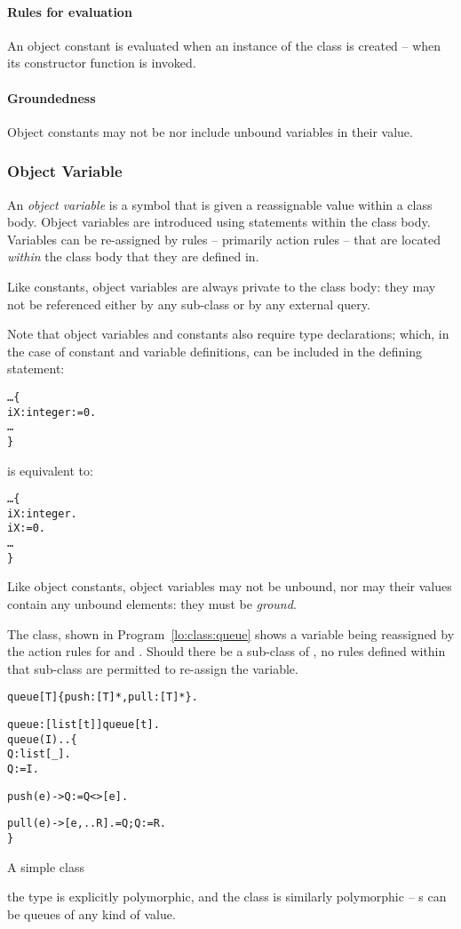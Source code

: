 \paragraph{Rules for evaluation}
An object constant is evaluated when an instance of the class is created -- when its constructor function is invoked.

\paragraph{Groundedness}
Object constants may not be nor include unbound variables in their value. 

\subsubsection{Object Variable}
\label{lo:variable}
An \emph{object variable} is a symbol that is given a reassignable value within a class body. Object variables are introduced using \q{:=} statements within the class body. Variables can be re-assigned by rules -- primarily action rules -- that are located \emph{within} the class body that they are defined in. 

Like constants, object variables are always private to the class body: they may not be referenced either by any sub-class or by any external query.

Note that object variables and constants also require type declarations; which, in the case of constant and variable definitions, can be included in the defining statement:
\begin{alltt}
\ldots\{
  iX:integer := 0.
\ldots
\}
\end{alltt}
is equivalent to:
\begin{alltt}
\ldots\{
  iX:integer.
  iX := 0.
\ldots
\}
\end{alltt}
Like object constants, object variables may not be unbound, nor may their values contain any unbound elements: they must be \emph{ground}.


The  class, shown in Program~\vref{lo:class:queue} shows a variable being reassigned by the action rules for  and . Should there be a sub-class of , no rules defined within that sub-class are permitted to re-assign the  variable.

\begin{program}
\begin{boxed}
\begin{alltt}
queue[T] \impl \{ push:[T]*, pull:[T]* \}.

queue:[list[t]] \sconarrow{} queue[t].
queue(I)..\{
  Q : list[_].
  Q := I.
  
  push(e) -> Q := Q<>[e].
    
  pull(e) -> [e,..R].=Q; Q := R.
\}
\end{alltt}
\end{boxed}
\caption{\label{lo:class:queue}A simple  class}
\end{program}
the  type is explicitly polymorphic, and the  class is similarly polymorphic -- s can be queues of any kind of value.

